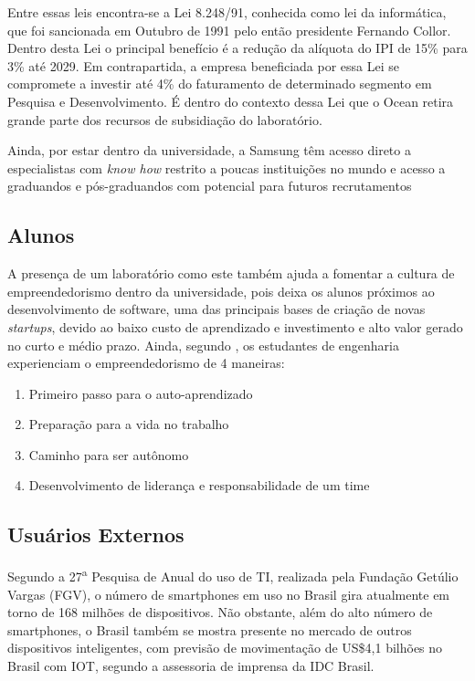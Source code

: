 Entre essas leis encontra-se a Lei 8.248/91, conhecida como lei da informática, que foi sancionada em Outubro de 1991 pelo então presidente Fernando Collor. Dentro desta Lei o principal benefício é a redução da alíquota do IPI de 15\% para 3\% até 2029. Em contrapartida, a empresa beneficiada por essa Lei se compromete a investir até 4\% do faturamento de determinado segmento em Pesquisa e Desenvolvimento. É dentro do contexto dessa Lei que o Ocean retira grande parte dos recursos de subsidiação do laboratório. 

Ainda, por estar dentro da universidade, a Samsung têm acesso direto a especialistas com \textit{know how} restrito a poucas instituições no mundo e acesso a graduandos e pós-graduandos com potencial para futuros recrutamentos 

\subsection{Alunos}
\label{sec:con_alunos}

A presença de um laboratório como este também ajuda a fomentar a cultura de empreendedorismo dentro da universidade, pois deixa os alunos próximos ao desenvolvimento de software, uma das principais bases de criação de novas \textit{startups}, devido ao baixo custo de aprendizado e investimento e alto valor gerado no curto e médio prazo. Ainda, segundo , os estudantes de engenharia experienciam o empreendedorismo de 4 maneiras: 

\begin{enumerate}
\item Primeiro passo para o auto-aprendizado
\item Preparação para a vida no trabalho
\item Caminho para ser autônomo
\item Desenvolvimento de liderança e responsabilidade de um time
\end{enumerate}

\subsection{Usuários Externos}
\label{sec:con_usuarios}

Segundo a 27\textsuperscript{a} Pesquisa de Anual do uso de TI, realizada pela Fundação Getúlio Vargas (FGV), o número de smartphones em uso no Brasil gira atualmente em torno de 168 milhões de dispositivos. \cite{tifgv} Não obstante, além do alto número de smartphones, o Brasil também se mostra presente no mercado de outros dispositivos inteligentes, com previsão de movimentação de US\$4,1 bilhões no Brasil com IOT, segundo a assessoria de imprensa da IDC Brasil. \cite{idc}


